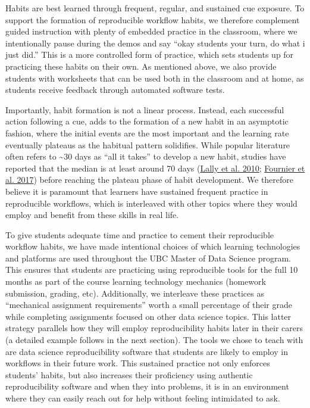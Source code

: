\documentclass[
  12 pt,
]{paper}
\begin{document}
Habits are best learned through frequent, regular, and sustained cue exposure.
To support the formation of reproducible workflow habits,
we therefore complement guided instruction
with plenty of embedded practice in the classroom,
where we intentionally pause during the demos
and say ``okay students your turn, do what i just did.''
This is a more controlled form of practice,
which sets students up for practicing these habits on their own.
As mentioned above,
we also provide students with worksheets
that can be used both in the classroom and at home,
as students receive feedback through automated software tests.

Importantly,
habit formation is not a linear process.
Instead,
each successful action following a cue,
adds to the formation of a new habit in an asymptotic fashion,
where the initial events are the most important
and the learning rate eventually plateaus as the habitual pattern solidifies.
While popular literature often refers to \textasciitilde30 days as ``all it takes''
to develop a new habit,
studies have reported that the median is at least around 70 days (\protect\hyperlink{ref-wardle_lally_2010}{Lally et al. 2010}; \protect\hyperlink{ref-radel_fournier_2017}{Fournier et al. 2017})
before reaching the plateau phase of habit development.
We therefore believe it is paramount
that learners have sustained frequent practice in reproducible workflows,
which is interleaved with other topics
where they would employ and benefit from these skills in real life.

To give students adequate time and practice to cement their reproducible workflow habits,
we have made intentional choices of which learning technologies and platforms
are used throughout the UBC Master of Data Science program.
This ensures that students are practicing using reproducible tools
for the full 10 months as part of the course learning technology mechanics
(homework submission, grading, etc).
Additionally, we interleave these practices as
``mechanical assignment requirements'' worth a small percentage of their
grade while completing assignments focused on other data science topics.
This latter strategy parallels how they will employ reproducibility
habits later in their carers
(a detailed example follows in the next section).
The tools we chose to teach with are data science reproducibility software
that students are likely to employ in workflows in their future work.
This sustained practice not only enforces students' habits,
but also increases their proficiency using authentic reproducibility software
and when they into problems, it is in an environment
where they can easily reach out for help without feeling intimidated to ask.
\end{document}
